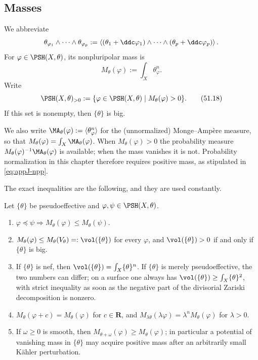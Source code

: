 \subsection{Masses}
\label{sec:ch51-masses}

We abbreviate
\[
 \theta_{\varphi_1}\wedge\cdots\wedge\theta_{\varphi_p}
 :=\left\langle
   (\theta_1+\ddc\varphi_1)\wedge\cdots\wedge
   (\theta_p+\ddc\varphi_p)\right\rangle .
\]
For $\varphi\in\PSH(X,\theta)$, its nonpluripolar mass is
\[
                         M_\theta(\varphi)
 :=\int_X\theta_\varphi^n.
\tag{51.17}\label{eq:complex-npp-mass}
\]
Write
\[
 \PSH(X,\theta)_{>0}
 :=\{\varphi\in\PSH(X,\theta)\mid M_\theta(\varphi)>0\}.
\tag{51.18}\label{eq:complex-positive-mass}
\]
If this set is nonempty, then $\{\theta\}$ is big.

We also write $\MA_\theta(\varphi):=\langle\theta_\varphi^n\rangle$ for
the (unnormalized) Monge--Amp\`ere measure, so that
$M_\theta(\varphi)=\int_X\MA_\theta(\varphi)$.  When
$M_\theta(\varphi)>0$ the probability measure
$M_\theta(\varphi)^{-1}\MA_\theta(\varphi)$ is available; when the mass
vanishes it is not. Probability normalization in this chapter therefore
requires positive mass, as stipulated in \eqref{eq:appJ-npp}.

The exact inequalities are the following, and they are used constantly.

\begin{proposition}\label{prop:ch51-mass-inequalities}
Let $\{\theta\}$ be pseudoeffective and $\varphi,\psi\in
\PSH(X,\theta)$.
\begin{enumerate}
\item\label{itm:ch51-mi:monotone}
      $\varphi\preceq\psi\Rightarrow
      M_\theta(\varphi)\leq M_\theta(\psi)$.
\item\label{itm:ch51-mi:minimal}
      $M_\theta(\varphi)\leq M_\theta(V_\theta)=:\vol(\{\theta\})$ for
      every $\varphi$, and $\vol(\{\theta\})>0$ if and only if
      $\{\theta\}$ is big.
\item\label{itm:ch51-mi:nef}
      If $\{\theta\}$ is nef, then
      $\vol(\{\theta\})=\int_X\{\theta\}^n$.  If $\{\theta\}$ is
      merely pseudoeffective, the two numbers can differ; on a surface one
      always has $\vol(\{\theta\})\geq\int_X\{\theta\}^2$, with strict
      inequality as soon as the negative part of the divisorial Zariski
      decomposition is nonzero.
\item\label{itm:ch51-mi:translation}
      $M_\theta(\varphi+c)=M_\theta(\varphi)$ for $c\in\mathbf R$, and
      $M_{\lambda\theta}(\lambda\varphi)=\lambda^nM_\theta(\varphi)$ for
      $\lambda>0$.
\item\label{itm:ch51-mi:perturb}
      If $\omega\geq0$ is smooth, then
      $M_{\theta+\omega}(\varphi)\geq M_\theta(\varphi)$; in particular
      a potential of vanishing mass in $\{\theta\}$ may acquire positive
      mass after an arbitrarily small K\"ahler perturbation.
\end{enumerate}
\end{proposition}


